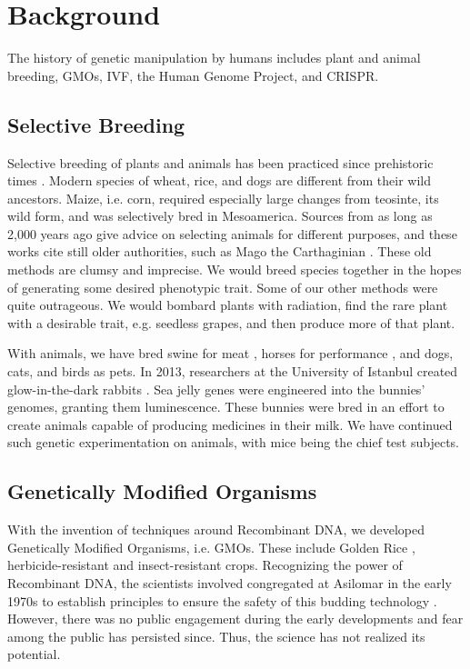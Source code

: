 \section{Background}
\label{sec:background}

The history of genetic manipulation by humans includes plant and animal breeding, GMOs, IVF, the Human Genome Project, and CRISPR.

\subsection{Selective Breeding}

Selective breeding of plants and animals has been practiced since prehistoric times \cite{Buffum1909}.
Modern species of wheat, rice, and dogs are different from their wild ancestors.
Maize, i.e. corn, required especially large changes from teosinte, its wild form, and was selectively bred in Mesoamerica.
Sources from as long as 2,000 years ago give advice on selecting animals for different purposes, and these works cite still older authorities, such as Mago the Carthaginian \cite{Lush2017}.
These old methods are clumsy and imprecise.
We would breed species together in the hopes of generating some desired phenotypic trait.
Some of our other methods were quite outrageous.
We would bombard plants with radiation, find the rare plant with a desirable trait, e.g. seedless grapes, and then produce more of that plant.

With animals, we have bred swine for meat \cite{OSU2011}, horses for performance \cite{Evans2000}, and dogs, cats, and birds as pets.
In 2013, researchers at the University of Istanbul created glow-in-the-dark rabbits \cite{Rojhan2013}.
Sea jelly genes were engineered into the bunnies' genomes, granting them luminescence.
These bunnies were bred in an effort to create animals capable of producing medicines in their milk.
We have continued such genetic experimentation on animals, with mice being the chief test subjects.

\subsection{Genetically Modified Organisms}

With the invention of techniques around Recombinant DNA, we developed Genetically Modified Organisms, i.e. GMOs.
These include Golden Rice \cite{Xudong2000}, herbicide-resistant \cite{Funke2006} and insect-resistant \cite{Paine2005} crops.
Recognizing the power of Recombinant DNA, the scientists involved congregated at Asilomar in the early 1970s to establish principles to ensure the safety of this budding technology \cite{Berg1975}.
However, there was no public engagement during the early developments and fear among the public has persisted since.
Thus, the science has not realized its potential.


